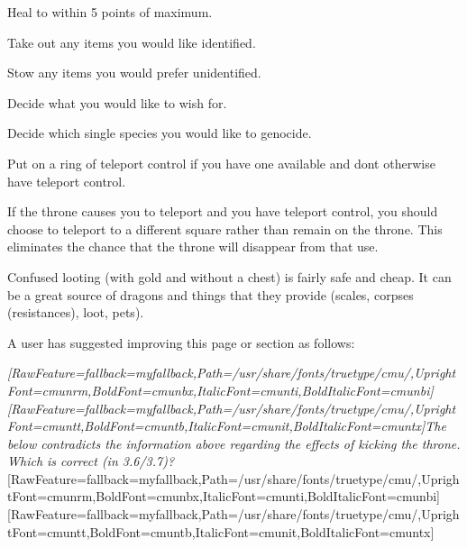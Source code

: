 \begin{myitemize}\item{}Heal to within 5 points of maximum.
\item{}Take out any items you would like identified.
\item{}Stow any items you would prefer unidentified.
\item{}Decide what you would like to wish for.
\item{}Decide which single species you would like to genocide.
\item{}Put on a ring of teleport control\footnotemark[123] if you have one available and don\textquotesingle{}t otherwise have teleport control\footnotemark[124].
\end{myitemize}

If the throne causes you to teleport and you have teleport control\footnotemark[125], you should choose to teleport to a different square rather than remain on the throne. This eliminates the chance that the throne will disappear from that use.


Confused looting (with gold and without a chest) is fairly safe and cheap. It can be a great source\footnotemark[126] of dragons and things that they provide (scales, corpses (resistances), loot, pets).




A user has suggested improving this page or section as follows:


{\itshape \allowbreak{}\setmainfont{cmunti.ttf}[RawFeature={fallback=myfallback},Path=/usr/share/fonts/truetype/cmu/,UprightFont=cmunrm,BoldFont=cmunbx,ItalicFont=cmunti,BoldItalicFont=cmunbi]\setmonofont{cmunti.ttf}[RawFeature={fallback=myfallback},Path=/usr/share/fonts/truetype/cmu/,UprightFont=cmuntt,BoldFont=cmuntb,ItalicFont=cmunit,BoldItalicFont=cmuntx]\itshape {}The below contradicts the information above regarding the effects of kicking the throne. Which is correct (in 3.6/3.7)?}\allowbreak{}\setmainfont{cmunrm.ttf}[RawFeature={fallback=myfallback},Path=/usr/share/fonts/truetype/cmu/,UprightFont=cmunrm,BoldFont=cmunbx,ItalicFont=cmunti,BoldItalicFont=cmunbi]\setmonofont{cmunrm.ttf}[RawFeature={fallback=myfallback},Path=/usr/share/fonts/truetype/cmu/,UprightFont=cmuntt,BoldFont=cmuntb,ItalicFont=cmunit,BoldItalicFont=cmuntx]




